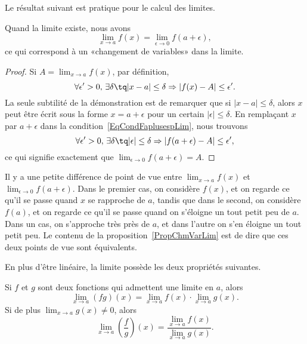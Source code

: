 Le résultat suivant est pratique pour le calcul des limites.
\begin{proposition}     \label{PropChmVarLim}
	Quand la limite existe, nous avons
	\[
		\lim_{x\to a}f(x)=\lim_{\epsilon\to 0}f(a+\epsilon),
	\]
	ce qui correspond à un «changement de variables» dans la limite.
\end{proposition}

\begin{proof}
	Si \( A=\lim_{x\to a}f(x)\), par définition,
	\begin{equation}        \label{EqCondFaplusespLim}
		\forall\epsilon'>0,\,\exists\delta \tq | x-a |\leq\delta\Rightarrow| f(x)-A |\leq\epsilon'.
	\end{equation}
	La seule subtilité de la démonstration est de remarquer que si \( | x-a |\leq\delta\), alors \( x\) peut être écrit sous la forme \( x=a+\epsilon\) pour un certain \( | \epsilon |\leq\delta\). En remplaçant \( x\) par \( a+\epsilon\) dans la condition~\ref{EqCondFaplusespLim}, nous trouvons
	\begin{equation}
		\forall\epsilon'>0,\,\exists\delta \tq | \epsilon |\leq\delta\Rightarrow| f(a+\epsilon)-A |\leq\epsilon',
	\end{equation}
	ce qui signifie exactement que \( \lim_{\epsilon\to 0}f(a+\epsilon)=A\).
\end{proof}

Il y a une petite différence de point de vue entre \( \lim_{x\to a}f(x)\) et \( \lim_{\epsilon\to 0}f(a+\epsilon)\). Dans le premier cas, on considère \( f(x)\), et on regarde ce qu'il se passe quand \( x\) se rapproche de \( a\), tandis que dans le second, on considère \( f(a)\), et on regarde ce qu'il se passe quand on s'éloigne un tout petit peu de \( a\). Dans un cas, on s'approche très près de \( a\), et dans l'autre on s'en éloigne un tout petit peu. Le contenu de la proposition~\ref{PropChmVarLim} est de dire que ces deux points de vue sont équivalents.


En plus d'être linéaire, la limite possède les deux propriétés suivantes.
\begin{proposition}     \label{PROPooDQFIooMMwxxJ}
	Si \( f\) et \( g\) sont deux fonctions qui admettent une limite en \( a\), alors
	\begin{equation}
		\lim_{x\to a} (fg)(x)=\lim_{x\to a} f(x)\cdot\lim_{x\to a} g(x).
	\end{equation}
	Si de plus \( \lim_{x\to a} g(x)\neq 0\), alors
	\begin{equation}
		\lim_{x\to a} \left(\frac{ f }{ g }\right)(x)=\frac{ \lim_{x\to a} f(x) }{ \lim_{x\to a} g(x) }.
	\end{equation}
\end{proposition}

